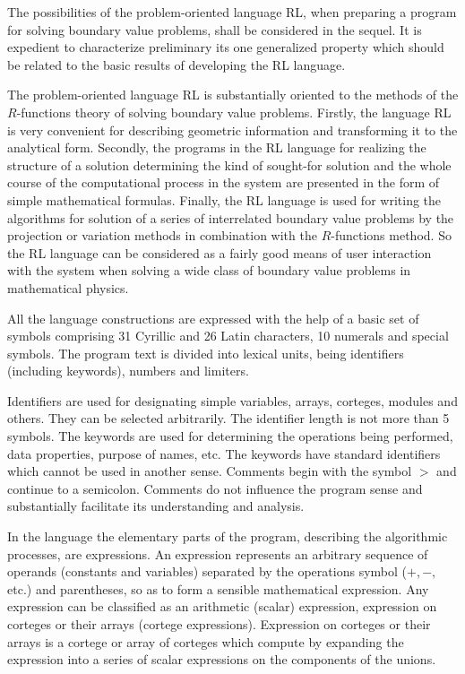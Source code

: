 The possibilities of the problem-oriented language RL, when preparing a
program for solving boundary value problems, shall be considered in the
sequel. It is expedient to characterize preliminary its one generalized
property which should be related to the basic results of developing the RL
language.

The problem-oriented language RL is substantially oriented to the methods of
the $R$-functions theory of solving boundary value problems. Firstly, the
language RL is very convenient for describing geometric information and
transforming it to the analytical form. Secondly, the programs in the RL
language for realizing the structure of a solution determining the kind of
sought-for solution and the whole course of the computational process in the
system are presented in the form of simple mathematical formulas. Finally,
the RL language is used for writing the algorithms for solution of a series
of interrelated boundary value problems by the projection or variation
methods in combination with the $R$-functions method. So the RL language can
be considered as a fairly good means of user interaction with the system
when solving a wide class of boundary value problems in mathematical physics.

All the language constructions are expressed with the help of a basic set of
symbols comprising 31 Cyrillic and 26 Latin characters, 10 numerals and
special symbols. The program text is divided into lexical units, being
identifiers (including keywords), numbers and limiters.

Identifiers are used for designating simple variables, arrays, corteges,
modules and others. They can be selected arbitrarily. The identifier length
is not more than 5 symbols. The keywords are used for determining the
operations being performed, data properties, purpose of names, etc. The
keywords have standard identifiers which cannot be used in another sense.
Comments begin with the symbol $>$ and continue to a semicolon. Comments do
not influence the program sense and substantially facilitate its
understanding and analysis.

In the language the elementary parts of the program, describing the
algorithmic processes, are expressions. An expression represents an
arbitrary sequence of operands (constants and variables) separated by the
operations symbol ($+,-,$ etc.) and parentheses, so as to form a sensible
mathematical expression. Any expression can be classified as an arithmetic
(scalar) expression, expression on corteges or their arrays (cortege
expressions). Expression on corteges or their arrays is a cortege or array
of corteges which compute by expanding the expression into a series of
scalar expressions on the components of the unions.


